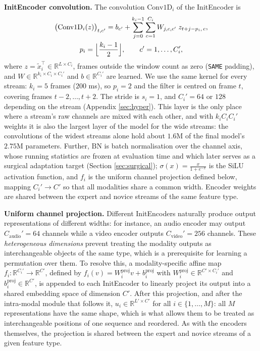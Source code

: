 \documentclass[10pt,a4paper,twocolumn]{article}
\newcommand{\R}{\mathbb{R}}
\begin{document}
	\textbf{InitEncoder convolution.} The convolution $\text{Conv1D}_i$ of the InitEncoder is
$$\begin{gathered}\bigl(\text{Conv1D}_i(z)\bigr)_{t,c'} = b_{c'} + \sum_{j=0}^{k_i-1}\sum_{c=1}^{C_i} W_{j,c,c'}\; z_{t+j-p_i,\,c}, \\ p_i = \Bigl\lfloor \frac{k_i-1}{2} \Bigr\rfloor, \qquad c' = 1, \dots, C_i',\end{gathered}$$
	where $z = \tilde{x}_i^{\top} \in \R^{L \times C_i}$, frames outside the window count as zero (\texttt{SAME} padding), and $W \in \R^{k_i \times C_i \times C_i'}$ and $b \in \R^{C_i'}$ are learned. We use the same kernel for every stream: $k_i = 5$ frames ($200$ ms), so $p_i = 2$ and the filter is centred on frame $t$, covering frames $t-2, \dots, t+2$. The stride is $s_i = 1$, and $C_i' = 64$ or $128$ depending on the stream (Appendix \ref{sec:hyper}). This layer is the only place where a stream's raw channels are mixed with each other, and with $k_i C_i C_i'$ weights it is also the largest layer of the model for the wide streams: the convolutions of the widest streams alone hold about $1.6$M of the final model's $2.75$M parameters. Further, $\text{BN}$ is batch normalisation \cite{ioffe2015batchnorm} over the channel axis, whose running statistics are frozen at evaluation time and which later serves as a surgical adaptation target (Section \ref{sec:surgical}); $\sigma(x) = \frac{x}{1 + e^{-x}}$ is the SiLU activation function, and $f_i$ is the uniform channel projection defined below, mapping $C_i' \to C'$ so that all modalities share a common width. Encoder weights are shared between the expert and novice streams of the same feature type.

	\textbf{Uniform channel projection.} Different InitEncoders naturally produce output representations of different widths: for instance, an audio encoder may output $C_{\text{audio}}' = 64$ channels while a video encoder outputs $C_{\text{video}}' = 256$ channels. These \emph{heterogeneous dimensions} prevent treating the modality outputs as interchangeable objects of the same type, which is a prerequisite for learning a permutation over them. To resolve this, a modality-specific affine map $f_i : \R^{C_i'} \to \R^{C'}$, defined by $f_i(v) = W_i^{\text{proj}} v + b_i^{\text{proj}}$ with $W_i^{\text{proj}} \in \R^{C' \times C_i'}$ and $b_i^{\text{proj}} \in \R^{C'}$, is appended to each InitEncoder to linearly project its output into a shared embedding space of dimension $C'$. After this projection, and after the intra-modal module that follows it, $u_i \in \R^{L' \times C'}$ for all $i \in \{1,\dots,M\}$: all $M$ representations have the same shape, which is what allows them to be treated as interchangeable positions of one sequence and reordered. As with the encoders themselves, the projection is shared between the expert and novice streams of a given feature type.
\end{document}
